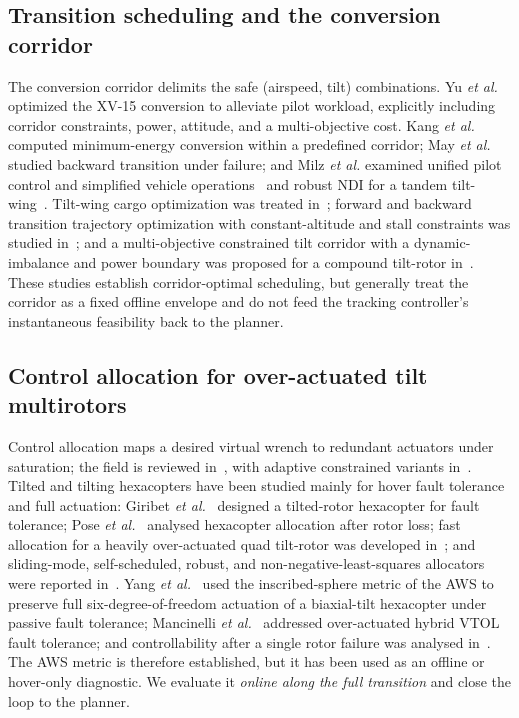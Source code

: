 \documentclass[preprint,3p,11pt]{elsarticle}
\begin{document}
\subsection{Transition scheduling and the conversion corridor}
The conversion corridor delimits the safe (airspeed, tilt) combinations.
Yu \emph{et al.}~\cite{yu2022pilot} optimized the XV-15 conversion to
alleviate pilot workload, explicitly including corridor constraints, power,
attitude, and a multi-objective cost. Kang \emph{et al.}~\cite{kang2024minimum}
computed minimum-energy conversion within a predefined corridor; May
\emph{et al.}~\cite{may2025backward} studied backward transition under
failure; and Milz \emph{et al.} examined unified pilot control and simplified
vehicle operations~\cite{milz2026taming} and robust NDI for a tandem
tilt-wing~\cite{milz2024tandem}. Tilt-wing cargo optimization was treated
in~\cite{chen2020tiltwing}; forward and backward transition trajectory
optimization with constant-altitude and stall constraints was studied
in~\cite{panish2024tiltwing}; and a multi-objective constrained tilt corridor
with a dynamic-imbalance and power boundary was proposed for a compound
tilt-rotor in~\cite{zhuang2025mctc}. These studies establish corridor-optimal
scheduling, but generally treat the corridor as a fixed offline envelope and
do not feed the tracking controller's instantaneous feasibility back to the
planner.

\subsection{Control allocation for over-actuated tilt multirotors}
Control allocation maps a desired virtual wrench to redundant actuators under
saturation; the field is reviewed in~\cite{johansen2013survey,blaha2023survey},
with adaptive constrained variants in~\cite{tohidi2020adaptive}. Tilted and
tilting hexacopters have been studied mainly for hover fault tolerance and
full actuation: Giribet \emph{et al.}~\cite{giribet2016tilted} designed a
tilted-rotor hexacopter for fault tolerance; Pose \emph{et al.}~\cite{pose2017hexacopter}
analysed hexacopter allocation after rotor loss; fast allocation for a heavily
over-actuated quad tilt-rotor was developed in~\cite{santos2021fast}; and
sliding-mode, self-scheduled, robust, and non-negative-least-squares allocators
were reported
in~\cite{nguyen2022smc,nguyen2018selfscheduled,baldini2023ftc,zheng2026safety}.
Yang \emph{et al.}~\cite{yang2026biaxial} used the inscribed-sphere metric of
the AWS to preserve full six-degree-of-freedom actuation of a biaxial-tilt
hexacopter under passive fault tolerance; Mancinelli
\emph{et al.}~\cite{mancinelli2025ftc} addressed over-actuated hybrid VTOL
fault tolerance; and controllability after a single rotor failure was analysed
in~\cite{du2015controllability}. The AWS metric is therefore established, but
it has been used as an offline or hover-only diagnostic. We evaluate it
\emph{online along the full transition} and close the loop to the planner.
\end{document}

